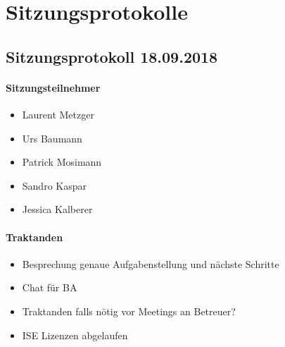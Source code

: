 \section{Sitzungsprotokolle}

\subsection{Sitzungsprotokoll 18.09.2018}

\paragraph{Sitzungsteilnehmer}
\begin{itemize}	
	\item Laurent Metzger 
	\item Urs Baumann 
	\item Patrick Mosimann
	\item Sandro Kaspar
	\item Jessica Kalberer
\end{itemize}

\paragraph{Traktanden}
\begin{itemize}
	\item Besprechung genaue Aufgabenstellung und nächste Schritte
	\item Chat für BA
	\item Traktanden falls nötig vor Meetings an Betreuer? 
	\item ISE Lizenzen abgelaufen
\end{itemize}

